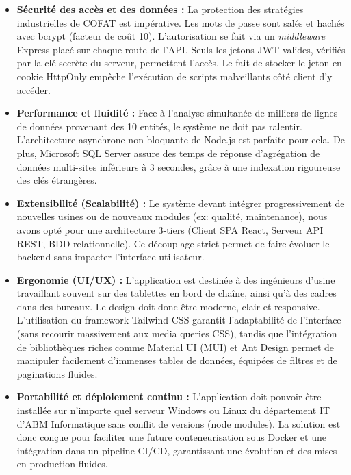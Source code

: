 \begin{itemize}
    \item \textbf{Sécurité des accès et des données :} La protection des stratégies industrielles de COFAT est impérative. Les mots de passe sont salés et hachés avec bcrypt (facteur de coût 10). L'autorisation se fait via un \textit{middleware} Express placé sur chaque route de l'API. Seuls les jetons JWT valides, vérifiés par la clé secrète du serveur, permettent l'accès. Le fait de stocker le jeton en cookie HttpOnly empêche l'exécution de scripts malveillants côté client d'y accéder.
    
    \item \textbf{Performance et fluidité :} Face à l'analyse simultanée de milliers de lignes de données provenant des 10 entités, le système ne doit pas ralentir. L'architecture asynchrone non-bloquante de Node.js est parfaite pour cela. De plus, Microsoft SQL Server assure des temps de réponse d'agrégation de données multi-sites inférieurs à 3 secondes, grâce à une indexation rigoureuse des clés étrangères.
    
    \item \textbf{Extensibilité (Scalabilité) :} Le système devant intégrer progressivement de nouvelles usines ou de nouveaux modules (ex: qualité, maintenance), nous avons opté pour une architecture 3-tiers (Client SPA React, Serveur API REST, BDD relationnelle). Ce découplage strict permet de faire évoluer le backend sans impacter l'interface utilisateur.
    
    \item \textbf{Ergonomie (UI/UX) :} L'application est destinée à des ingénieurs d'usine travaillant souvent sur des tablettes en bord de chaîne, ainsi qu'à des cadres dans des bureaux. Le design doit donc être moderne, clair et responsive. L'utilisation du framework Tailwind CSS garantit l'adaptabilité de l'interface (sans recourir massivement aux media queries CSS), tandis que l'intégration de bibliothèques riches comme Material UI (MUI) et Ant Design permet de manipuler facilement d'immenses tables de données, équipées de filtres et de paginations fluides.
    
    \item \textbf{Portabilité et déploiement continu :} L'application doit pouvoir être installée sur n'importe quel serveur Windows ou Linux du département IT d'ABM Informatique sans conflit de versions (node modules). La solution est donc conçue pour faciliter une future conteneurisation sous Docker et une intégration dans un pipeline CI/CD, garantissant une évolution et des mises en production fluides.
\end{itemize}

